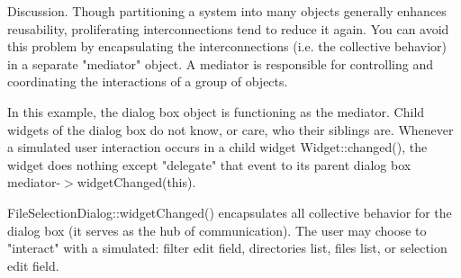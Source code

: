 \documentclass{book}
\begin{document}
Discussion. Though partitioning a system into many objects generally enhances reusability,
proliferating interconnections tend to reduce it again.
You can avoid this problem by encapsulating the interconnections (i.e. the collective behavior) in a separate "mediator" object.
A mediator is responsible for controlling and coordinating the interactions of a group of objects.

In this example, the dialog box object is functioning as the mediator.
Child widgets of the dialog box do not know, or care, who their siblings are.
Whenever a simulated user interaction occurs in a child widget Widget::changed(), the widget does nothing except "delegate" that event to its parent dialog box mediator-$>$widgetChanged(this).

FileSelectionDialog::widgetChanged() encapsulates all collective behavior for the dialog box (it serves as the hub of communication).
The user may choose to "interact" with a simulated: filter edit field, directories list, files list, or selection edit field.
\end{document}
